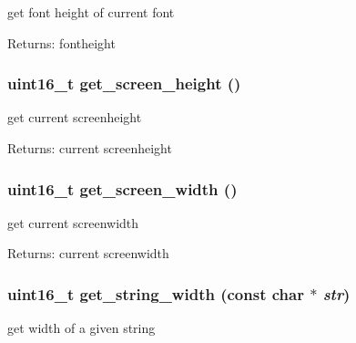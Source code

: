get font height of current font 

\begin{Desc}
\item[Returns:]fontheight \end{Desc}
\hypertarget{group__hgdi__api_g23427ee7a3a85ad4db15258a42636535}{
\subsubsection[{get\_\-screen\_\-height}]{\setlength{\rightskip}{0pt plus 5cm}uint16\_\-t get\_\-screen\_\-height ()}}
\label{group__hgdi__api_g23427ee7a3a85ad4db15258a42636535}


get current screenheight 

\begin{Desc}
\item[Returns:]current screenheight \end{Desc}
\hypertarget{group__hgdi__api_g8bec741a24e406cc198d14de6533b264}{
\subsubsection[{get\_\-screen\_\-width}]{\setlength{\rightskip}{0pt plus 5cm}uint16\_\-t get\_\-screen\_\-width ()}}
\label{group__hgdi__api_g8bec741a24e406cc198d14de6533b264}


get current screenwidth 

\begin{Desc}
\item[Returns:]current screenwidth \end{Desc}
\hypertarget{group__hgdi__api_gdc6bc2359b35da24a9bcf4b9449d8902}{
\subsubsection[{get\_\-string\_\-width}]{\setlength{\rightskip}{0pt plus 5cm}uint16\_\-t get\_\-string\_\-width (const char $\ast$ {\em str})}}
\label{group__hgdi__api_gdc6bc2359b35da24a9bcf4b9449d8902}


get width of a given string 

